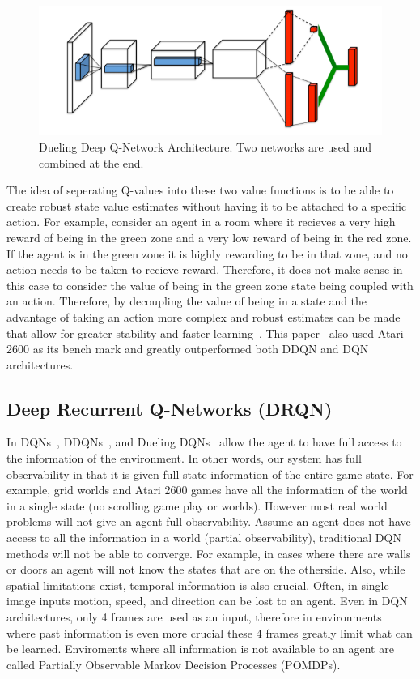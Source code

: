 \documentclass[12pt,american]{report}
\begin{document}
\begin{figure}
\centering
\includegraphics[scale=.85]{images/duelingDQN.png}
\caption{Dueling Deep Q-Network Architecture. Two networks are used and combined at the end.~\cite{wang2015dueling}}
\label{fig:duelingDQN}
\end{figure}

The idea of seperating Q-values into these two value functions is to be able to create robust state value estimates without having it to be attached to a specific action.  For example, consider an agent in a room where it recieves a very high reward of being in the green zone and a very low reward of being in the red zone. If the agent is in the green zone it is highly rewarding to be in that zone, and no action needs to be taken to recieve reward. Therefore, it does not make sense in this case to consider the value of being in the green zone state being coupled with an action. Therefore, by decoupling the value of being in a state and the advantage of taking an action more complex and robust estimates can be made that allow for greater stability and faster learning~\cite{wang2015dueling}. This paper~\cite{wang2015dueling} also used Atari 2600 as its bench mark and greatly outperformed both DDQN and DQN architectures. 

\subsection{Deep Recurrent Q-Networks (DRQN)}
In DQNs~\cite{atari}, DDQNs~\cite{van2016deep}, and Dueling DQNs~\cite{wang2015dueling} allow the agent to have full access to the information of the environment. In other words, our system has full observability in that it is given full state information of the entire game state.  For example, grid worlds and Atari 2600 games have all the information of the world in a single state (no scrolling game play or worlds). However most real world problems will not give an agent full observability. Assume an agent does not have access to all the information in a world (partial observability), traditional DQN methods will not be able to converge. For example, in cases where there are walls or doors an agent will not know the states that are on the otherside. Also, while spatial limitations exist, temporal information is also crucial.  Often, in single image inputs motion, speed, and direction can be lost to an agent. Even in DQN architectures, only 4 frames are used as an input, therefore in environments where past information is even more crucial these 4 frames greatly limit what can be learned. Enviroments where all information is not available to an agent are called Partially Observable Markov Decision Processes (POMDPs).  
\end{document}

